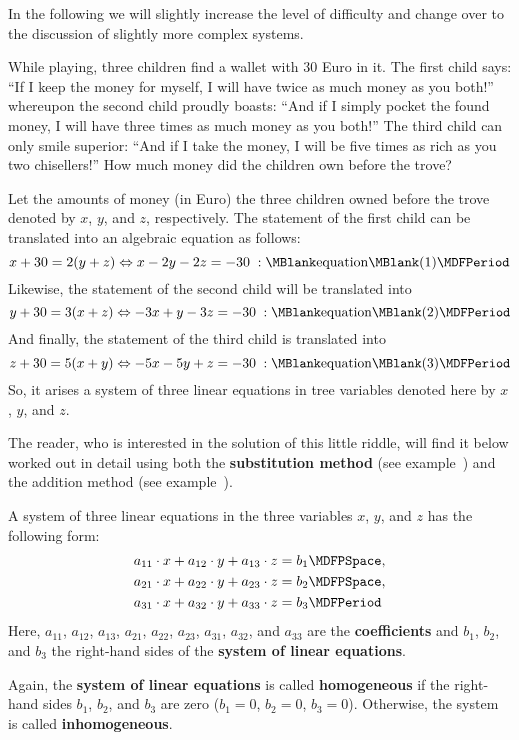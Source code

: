 \begin{MIntro}
In the following we will slightly increase the level of difficulty and 
change over to the discussion of slightly more complex systems.

\begin{MExample}
While playing, three children find a wallet with $30$ Euro in it. The first child says: 
``If I keep the money for myself, I will have twice as much money as you both!''  whereupon the 
second child proudly boasts: ``And if I simply pocket the found money, I will have three 
times as much money as you both!'' The third child can only smile superior: ``And if I take the 
money, I will be five times as rich as you two chisellers!'' How much money did the children
own before the trove?

Let the amounts of money (in Euro) the three children owned before the trove denoted by 
$x$, $y$, and $z$, respectively. The statement of the first child can be translated into
an algebraic equation as follows:
$$x + 30 = 2 (y + z) \Leftrightarrow x - 2 y - 2 z = - 30 \; : \MBlank\mbox{equation}\MBlank (1) \MDFPeriod$$
Likewise, the statement of the second child will be translated into
$$y + 30 = 3 (x + z) \Leftrightarrow - 3 x + y - 3 z = - 30 \; : \MBlank\mbox{equation}\MBlank (2) \MDFPeriod$$
And finally, the statement of the third child is translated into
$$z + 30 = 5 (x + y) \Leftrightarrow - 5 x - 5 y + z = - 30 \; : \MBlank\mbox{equation}\MBlank (3) \MDFPeriod$$
So, it arises a system of three linear equations in tree variables denoted here by $x$, $y$, and $z$. 
\end{MExample}
The reader, who is interested in the solution of this little riddle, will find it below 
worked out in detail using both the \textbf{substitution method} 
(see example~) and the addition method (see example~).
\begin{MInfo}
A system of three linear equations in the three variables $x$, $y$, and $z$ has
the following form:
\begin{eqnarray*}
a_{11} \cdot x + a_{12} \cdot y + a_{13} \cdot z & = b_1 \MDFPSpace, \\
a_{21} \cdot x + a_{22} \cdot y + a_{23} \cdot z & = b_2 \MDFPSpace, \\
a_{31} \cdot x + a_{32} \cdot y + a_{33} \cdot z & = b_3 \MDFPeriod
\end{eqnarray*}
Here, $a_{11}$, $a_{12}$, $a_{13}$, $a_{21}$, $a_{22}$, $a_{23}$, $a_{31}$, $a_{32}$, and $a_{33}$
are the \textbf{coefficients} and $b_1$, $b_2$, and $b_3$ the right-hand sides
of the \textbf{system of linear equations}.

Again, the \textbf{system of linear equations} is called \textbf{homogeneous} if 
the right-hand sides $b_1$, $b_2$, and $b_3$ are zero ($b_1 = 0$, $b_2 = 0$, $b_3 = 0$). 
Otherwise, the system is called \textbf{inhomogeneous}.
\end{MInfo}
\end{MIntro}

